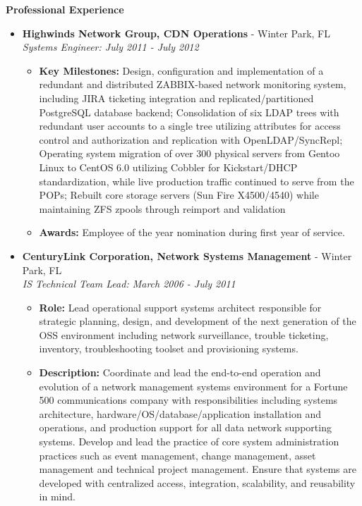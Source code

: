 \documentclass[10pt,oneside]{article}
\newenvironment{ressection}[1]{
	\vspace{4pt}
	\textbf{\selectfont\normalsize#1}
	\begin{itemize}
	\vspace{3pt}
}{
	\end{itemize}
}
\newcommand{\ressubitem}[1]{
	\vspace{-1pt}
	\item \begin{flushleft} #1 \end{flushleft}
}
\newcommand{\resbigitem}[3]{
	\vspace{-5pt}
	\item
	\textbf{#1} - #2 \\
	\textit{#3}
}
\newenvironment{ressubsec}[3]{
	\resbigitem{#1}{#2}{#3}
	\vspace{-2pt}
	\begin{itemize}
}{
	\end{itemize}
}
\begin{document}
\begin{ressection}{Professional Experience}
\begin{ressubsec}{Highwinds Network Group, CDN Operations}{Winter Park, FL}{Systems Engineer: July 2011 - July 2012}
		\ressubitem{\textbf{Key Milestones:} Design, configuration and implementation of a redundant and distributed ZABBIX-based network monitoring system, including JIRA ticketing integration and replicated/partitioned PostgreSQL database backend; Consolidation of six LDAP trees with redundant user accounts to a single tree utilizing attributes for access control and authorization and replication with OpenLDAP/SyncRepl; Operating system migration of over 300 physical servers from Gentoo Linux to CentOS 6.0 utilizing Cobbler for Kickstart/DHCP standardization, while live production traffic continued to serve from the POPs; Rebuilt core storage servers (Sun Fire X4500/4540) while maintaining ZFS zpools through reimport and validation}

		\ressubitem{\textbf{Awards:} Employee of the year nomination during first year of service.}

	\end{ressubsec}

	\begin{ressubsec}{CenturyLink Corporation, Network Systems Management}{Winter Park, FL}{IS Technical Team Lead: March 2006 - July 2011}

		\ressubitem{\textbf{Role:} Lead operational support systems architect responsible for strategic planning, design, and development of the next generation of the OSS environment including network surveillance, trouble ticketing, inventory, troubleshooting toolset and provisioning systems.}
		
		\ressubitem{\textbf{Description:} Coordinate and lead the end-to-end operation and evolution of a network management systems environment for a Fortune 500 communications company with responsibilities including systems architecture, hardware/OS/database/application installation and operations, and production support for all data network supporting systems.  Develop and lead the practice of core system administration practices such as event management, change management, asset management and technical project management. Ensure that systems are developed with centralized access, integration, scalability, and reusability in mind.}


\end{ressubsec}
\end{ressection}
\end{document}
